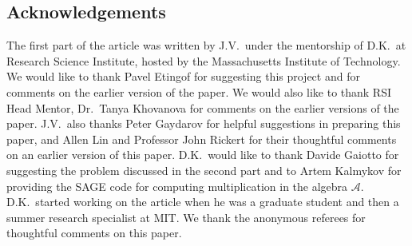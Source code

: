 \documentclass[pdftex]{sigma}
\newcommand{\mc}{\mathcal}
\numberwithin{equation}{section}
\theoremstyle{definition}
\begin{document}
\subsection*{Acknowledgements}
The first part of the article was written by J.V.\ under the mentorship of D.K.\ at Research Science Institute, hosted by the Massachusetts Institute of Technology. We would like to thank Pavel Etingof for suggesting this project and for comments on the earlier version of the paper.
We would also like to thank RSI Head Mentor, Dr.~Tanya Khovanova for comments on the earlier versions of the paper.
J.V.\ also thanks Peter Gaydarov
for helpful suggestions in preparing this paper,
and Allen Lin and Professor John Rickert for
their thoughtful comments on an earlier version of this paper.
D.K.\ would like to thank Davide Gaiotto for suggesting the problem discussed in the second part and to Artem Kalmykov for providing the SAGE code for computing multiplication in the algebra $\mc{A}$. D.K.\ started working on the article when he was a graduate student and then a summer research specialist at MIT.
We thank the anonymous referees for thoughtful comments on this paper.
\end{document}
